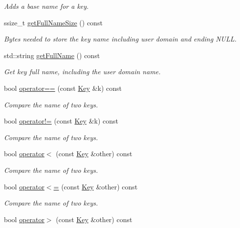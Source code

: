 \begin{DoxyCompactItemize}
\begin{DoxyCompactList}\small\item\em Adds a base name for a key. \end{DoxyCompactList}\item 
ssize\+\_\+t \hyperlink{classkdb_1_1Key_a92d6ec8adb547051b2861749e25e954e}{get\+Full\+Name\+Size} () const
\begin{DoxyCompactList}\small\item\em Bytes needed to store the key name including user domain and ending N\+U\+LL. \end{DoxyCompactList}\item 
std\+::string \hyperlink{classkdb_1_1Key_aae77aecb3dece445f103b3ce81b02515}{get\+Full\+Name} () const
\begin{DoxyCompactList}\small\item\em Get key full name, including the user domain name. \end{DoxyCompactList}\item 
bool \hyperlink{classkdb_1_1Key_ae52e7f4c4461db5356ddeef64a870cad}{operator==} (const \hyperlink{classkdb_1_1Key}{Key} \&k) const
\begin{DoxyCompactList}\small\item\em Compare the name of two keys. \end{DoxyCompactList}\item 
bool \hyperlink{classkdb_1_1Key_a7cf40dd6e79e63765c9535a8fcee6491}{operator!=} (const \hyperlink{classkdb_1_1Key}{Key} \&k) const
\begin{DoxyCompactList}\small\item\em Compare the name of two keys. \end{DoxyCompactList}\item 
bool \hyperlink{classkdb_1_1Key_aae9d359b54dc0df7d7b3ab3755a09732}{operator$<$} (const \hyperlink{classkdb_1_1Key}{Key} \&other) const
\begin{DoxyCompactList}\small\item\em Compare the name of two keys. \end{DoxyCompactList}\item 
bool \hyperlink{classkdb_1_1Key_addb92d7d52f80fc0cafa40d60fe0564f}{operator$<$=} (const \hyperlink{classkdb_1_1Key}{Key} \&other) const
\begin{DoxyCompactList}\small\item\em Compare the name of two keys. \end{DoxyCompactList}\item 
bool \hyperlink{classkdb_1_1Key_af616a48861b70b93e6f5955206c9257e}{operator$>$} (const \hyperlink{classkdb_1_1Key}{Key} \&other) const

\end{DoxyCompactItemize}
